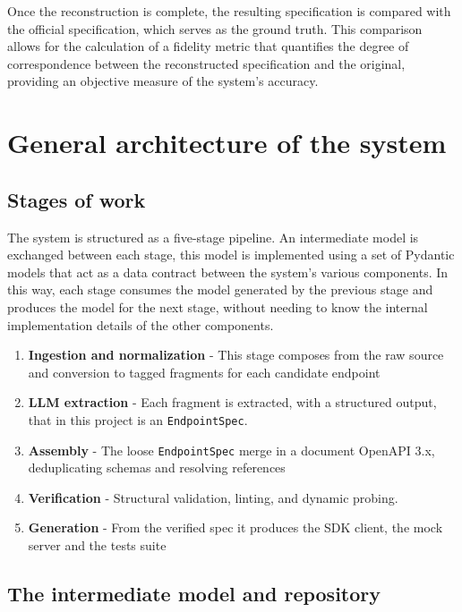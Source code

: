 Once the reconstruction is complete, the resulting specification 
is compared with the official specification, which serves as the 
ground truth. This comparison allows for the calculation of a 
fidelity metric that quantifies the degree of correspondence 
between the reconstructed specification and the original, 
providing an objective measure of the system’s accuracy.

\section{General architecture of the system}

\subsection{Stages of work}

The system is structured as a five-stage pipeline.
An intermediate model is exchanged between each stage, this model 
is implemented using a set of Pydantic models that act as a data 
contract between the system’s various components. In this way, 
each stage consumes the model generated by the previous stage 
and produces the model for the next stage, without needing to 
know the internal implementation details of the other components.

\begin{enumerate}[label=\arabic*.]
    \item \textbf{Ingestion and normalization} - This stage composes from the
    raw source and conversion to tagged fragments for each candidate endpoint
    \item \textbf{LLM extraction} - Each fragment is extracted, with a structured
    output, that in this project is an \texttt{EndpointSpec}.
    \item \textbf{Assembly} - The loose \texttt{EndpointSpec} merge
    in a document OpenAPI 3.x, deduplicating schemas and resolving references
    \item \textbf{Verification} - Structural validation, linting,
    and dynamic probing.
    \item \textbf{Generation} - From the verified spec it produces the SDK client,
    the mock server and the tests suite
\end{enumerate}

\subsection{The intermediate model and repository}

